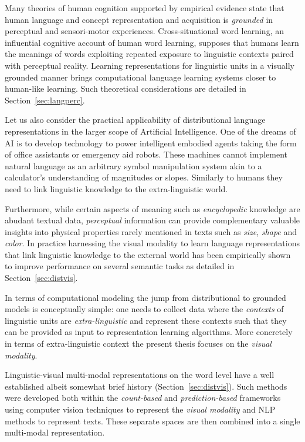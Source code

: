 Many theories of human cognition supported by empirical
evidence state that human language and concept representation and acquisition is \emph{grounded}
in perceptual and sensori-motor experiences. Cross-situational word learning,
an influential cognitive account of human word learning, supposes that humans learn the
meanings of words exploiting repeated exposure to linguistic contexts paired with perceptual reality.
Learning representations for linguistic units in a visually grounded manner brings
computational language learning systems closer to human-like learning.
Such theoretical considerations are detailed in Section~\ref{sec:langperc}.

Let us also consider the practical applicability of distributional language representations in the larger scope of Artificial
Intelligence. One of the dreams of AI is to develop technology to power intelligent embodied agents
taking the form of office assistants or emergency aid robots. These machines cannot implement natural
language as an arbitrary symbol manipulation system akin to a calculator's understanding of
magnitudes or slopes.
Similarly to humans they need to link linguistic knowledge to the extra-linguistic world.

Furthermore, while certain aspects of meaning  such as \emph{encyclopedic}
knowledge are abudant textual data, \emph{perceptual} information
can provide complementary valuable insights into physical properties rarely mentioned 
in texts such as \emph{size}, \emph{shape} and \emph{color}. 
In practice harnessing the visual modality to learn language
representations that link linguistic knowledge
to the external world  has been empirically shown to improve performance on several semantic tasks as
detailed in Section~\ref{sec:distvis}.


In terms of computational modeling the jump from
distributional to grounded models is conceptually simple: one needs to collect data where
the \emph{contexts} of linguistic units are \emph{extra-linguistic} and represent these contexts such
that they can be provided as input to representation learning algorithms.
More concretely in terms of extra-linguistic context the present thesis focuses on the \emph{visual modality}.

Linguistic-visual multi-modal representations on the word level have a well established albeit
somewhat brief history (Section~\ref{sec:distvis}).
Such methods were developed both within the \emph{count-based}
and \emph{prediction-based} frameworks using computer vision techniques to represent the
\emph{visual modality} and NLP methods to represent texts.
These separate spaces are then combined into a single multi-modal representation.

